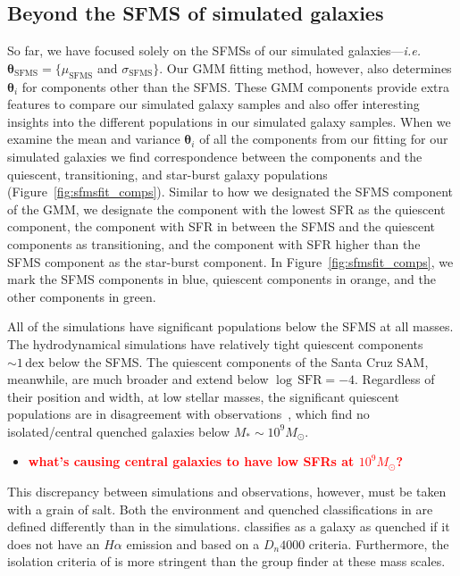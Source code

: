 \documentclass[preprint2,tighten]{aastex62}
\newcommand{\todo}[1]{{\bf \textcolor{red}{ #1}}}
\begin{document}
\subsection{Beyond the SFMS of simulated galaxies}
So far, we have focused solely on the SFMSs of our simulated 
galaxies---\emph{i.e.} $\bm{\theta}_\mathrm{SFMS} = \{\mu_\mathrm{SFMS}$ 
and $\sigma_\mathrm{SFMS} \}$. Our GMM fitting method, however, also determines 
$\bm{\theta}_i$ for components other than the SFMS. These GMM components 
provide extra features to compare our simulated galaxy samples and also offer 
interesting insights into the different populations in our simulated galaxy
samples. When we examine the mean and variance $\bm{\theta}_i$ of all the 
components from our fitting for our simulated galaxies we find correspondence 
between the components and the quiescent, transitioning, and star-burst galaxy 
populations (Figure~\ref{fig:sfmsfit_comps}). Similar to how we designated the 
SFMS component of the GMM, we designate the component with the lowest SFR as the quiescent 
component, the component with SFR in between the SFMS and the quiescent 
components as transitioning, and the component with SFR higher than the 
SFMS component as the star-burst component. In Figure~\ref{fig:sfmsfit_comps}, 
we mark the SFMS components in blue, quiescent components in orange, and 
the other components in green. 

All of the simulations have significant populations below the SFMS at all 
masses. The hydrodynamical simulations have relatively tight quiescent components 
${\sim}1\,\mathrm{dex}$ below the SFMS. The quiescent components of the 
Santa Cruz SAM, meanwhile, are much broader and extend below 
$\log\,\mathrm{SFR} = -4$. Regardless of their position and width, at low stellar
masses, the significant quiescent populations are in disagreement with 
observations~\citep{geha2012}, which find no isolated/central quenched 
galaxies below $M_*{\sim}10^9 M_\odot$. 
\begin{itemize}
    \item \todo{what's causing central galaxies to have low SFRs at $10^9M_\odot$?}
\end{itemize}
This discrepancy between simulations and observations, however, must be 
taken with a grain of salt. Both the environment and quenched classifications 
in \cite{geha2012} are defined differently than in the simulations. 
\cite{geha2012} classifies as a galaxy as quenched if it
does not have an $H\alpha$ emission and based on a $D_n 4000$ criteria. 
Furthermore, the isolation criteria of \cite{geha2012} is more 
stringent than the group finder at these mass scales.
\end{document}
